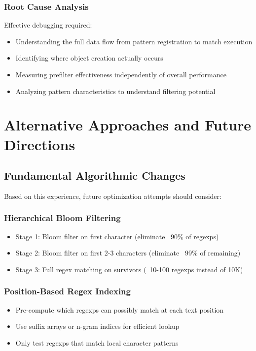 \documentclass[11pt,a4paper]{article}
\begin{document}
\subsubsection{Root Cause Analysis}
Effective debugging required:
\begin{itemize}
\item Understanding the full data flow from pattern registration to match execution
\item Identifying where object creation actually occurs
\item Measuring prefilter effectiveness independently of overall performance
\item Analyzing pattern characteristics to understand filtering potential
\end{itemize}

\section{Alternative Approaches and Future Directions}

\subsection{Fundamental Algorithmic Changes}

Based on this experience, future optimization attempts should consider:

\subsubsection{Hierarchical Bloom Filtering}
\begin{itemize}
\item Stage 1: Bloom filter on first character (eliminate ~90\% of regexps)
\item Stage 2: Bloom filter on first 2-3 characters (eliminate ~99\% of remaining)
\item Stage 3: Full regex matching on survivors (~10-100 regexps instead of 10K)
\end{itemize}

\subsubsection{Position-Based Regex Indexing}
\begin{itemize}
\item Pre-compute which regexps can possibly match at each text position
\item Use suffix arrays or n-gram indices for efficient lookup
\item Only test regexps that match local character patterns
\end{itemize}
\end{document}
